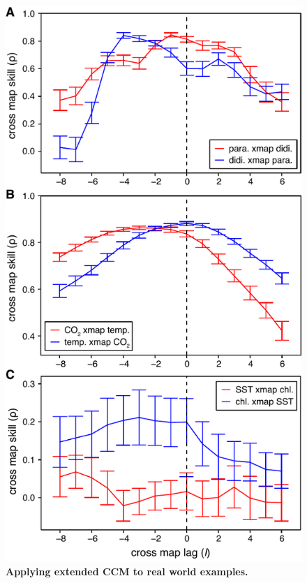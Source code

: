 \begin{figure}[!ht]
\begin{center}\includegraphics[scale = 0.55]{fig_lag_real_examples.pdf}\end{center}
\label{fig_lag_real_examples}
\caption[Applying extended CCM to real world examples.]{\textbf{Applying extended CCM to real world examples.}\newline
}
\end{figure}
